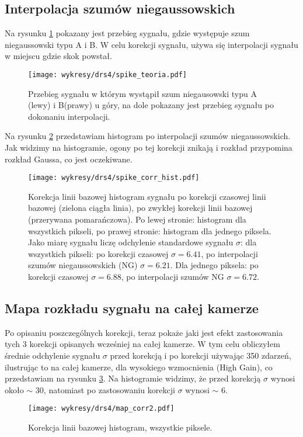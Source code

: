 \documentclass[a4paper,11pt,twoside]{article}
\begin{document}
\subsection{Interpolacja szumów niegaussowskich}
Na rysunku \ref{fig:spike_corr} pokazany jest przebieg sygnału, gdzie występuje szum niegaussowski typu A i B. W celu korekcji sygnału, używa się interpolacji sygnału w miejscu gdzie skok powstał.
\begin{figure}[H] 
\centering
\texttt{[image: wykresy/drs4/spike\_teoria.pdf]}
\caption{Przebieg sygnału w którym wystąpił szum niegausowski typu A (lewy) i B(prawy) u góry, na dole pokazany jest przebieg sygnału po dokonaniu interpolacji.}
\label{fig:spike_corr}
\end{figure}
Na rysunku \ref{fig:spike_hist} przedstawiam histogram po interpolacji szumów niegaussowskich. Jak widzimy na histogramie, ogony po tej korekcji znikają i rozkład przypomina rozkład Gaussa, co jest oczekiwane.
\begin{figure}[H] 
\centering
\texttt{[image: wykresy/drs4/spike\_corr\_hist.pdf]}
\caption{Korekcja linii bazowej histogram sygnału po korekcji czasowej linii bazowej (zielona ciągła linia), po zwykłej korekcji linii bazowej (przerywana pomarańczowa). Po lewej stronie: histogram dla wszystkich pikseli, po prawej stronie: histogram dla jednego piksela.
Jako miarę sygnału liczę odchylenie standardowe sygnału $\sigma$: dla wszystkich pikseli: po korekcji czasowej $\sigma = 6.41$, po interpolacji szumów niegaussowskich (NG) $\sigma = 6.21$. Dla jednego piksela: po korekcji czasowej $\sigma = 6.88$, po interpolacji szumów NG $\sigma = 6.72$.}
\label{fig:spike_hist}
\end{figure}
\subsection{Mapa rozkładu sygnału na całej kamerze}
Po opisaniu poszczególnych korekcji, teraz pokaże jaki jest efekt zastosowania tych 3 korekcji opisanych wcześniej na całej kamerze. W tym celu obliczyłem średnie odchylenie sygnału $\sigma$ przed korekcją i po korekcji używając 350 zdarzeń, ilustrując to na całej kamerze, dla  wysokiego wzmocnienia (High Gain), co przedstawiam na rysunku \ref{fig:map_cam_corr}. Na histogramie widzimy, że przed korekcją $\sigma$ wynosi około $\sim$ 30, natomiast po zastosowaniu korekcji $\sigma$ wynosi $\sim$ 6.
\begin{figure}[H] 
\centering
\texttt{[image: wykresy/drs4/map\_corr2.pdf]}
\caption{Korekcja linii bazowej histogram, wszystkie piksele.}
\label{fig:map_cam_corr}
\end{figure}
\end{document}
